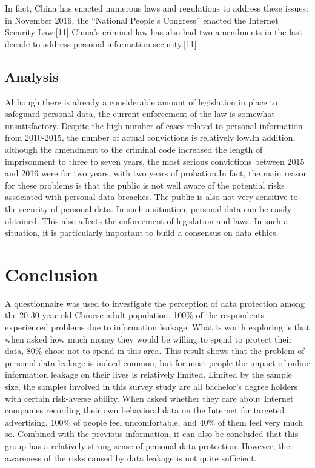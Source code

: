 \documentclass[
]{article}
\begin{document}
In fact, China has enacted numerous laws and regulations to address
these issues: in November 2016, the ``National People's Congress''
enacted the Internet Security Law.{[}11{]} China's criminal law has also
had two amendments in the last decade to address personal information
security.{[}11{]}

\hypertarget{analysis}{%
\subsection{Analysis}\label{analysis}}

Although there is already a considerable amount of legislation in place
to safeguard personal data, the current enforcement of the law is
somewhat unsatisfactory. Despite the high number of cases related to
personal information from 2010-2015, the number of actual convictions is
relatively low.In addition, although the amendment to the criminal code
increased the length of imprisonment to three to seven years, the most
serious convictions between 2015 and 2016 were for two years, with two
years of probation.In fact, the main reason for these problems is that
the public is not well aware of the potential risks associated with
personal data breaches. The public is also not very sensitive to the
security of personal data. In such a situation, personal data can be
easily obtained. This also affects the enforcement of legislation and
laws. In such a situation, it is particularly important to build a
consensus on data ethics.

\hypertarget{conclusion}{%
\section{Conclusion}\label{conclusion}}

A questionnaire was used to investigate the perception of data
protection among the 20-30 year old Chinese adult population. 100\% of
the respondents experienced problems due to information leakage. What is
worth exploring is that when asked how much money they would be willing
to spend to protect their data, 80\% chose not to spend in this area.
This result shows that the problem of personal data leakage is indeed
common, but for most people the impact of online information leakage on
their lives is relatively limited. Limited by the sample size, the
samples involved in this survey study are all bachelor's degree holders
with certain risk-averse ability. When asked whether they care about
Internet companies recording their own behavioral data on the Internet
for targeted advertising, 100\% of people feel uncomfortable, and 40\%
of them feel very much so. Combined with the previous information, it
can also be concluded that this group has a relatively strong sense of
personal data protection. However, the awareness of the risks caused by
data leakage is not quite sufficient.
\end{document}
